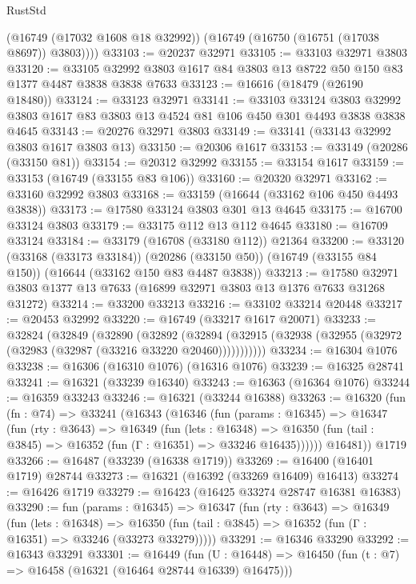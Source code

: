 \begin{lexlean}{RustStd}
\begin{coremodule}
        (@16749 (@17032 @1608 @18 @32992))
        (@16749 (@16750 (@16751 (@17038 @8697)) @3803))))
@33103 := @20237 @32971
@33105 := @33103 @32971 @3803
@33120 := @33105 @32992 @3803 @1617 @84 @3803 @13 @8722 @50 @150 @83 @1377 @4487 @3838 @3838 @7633
@33123 := @16616 (@18479 (@26190 @18480))
@33124 := @33123 @32971
@33141 := @33103
    @33124
    @3803
    @32992
    @3803
    @1617
    @83
    @3803
    @13
    @4524
    @81
    @106
    @450
    @301
    @4493
    @3838
    @3838
    @4645
@33143 := @20276 @32971 @3803
@33149 := @33141 (@33143 @32992 @3803 @1617 @3803 @13)
@33150 := @20306 @1617
@33153 := @33149 (@20286 (@33150 @81))
@33154 := @20312 @32992
@33155 := @33154 @1617
@33159 := @33153 (@16749 (@33155 @83 @106))
@33160 := @20320 @32971
@33162 := @33160 @32992 @3803
@33168 := @33159 (@16644 (@33162 @106 @450 @4493 @3838))
@33173 := @17580 @33124 @3803 @301 @13 @4645
@33175 := @16700 @33124 @3803
@33179 := @33175 @112 @13 @112 @4645
@33180 := @16709 @33124
@33184 := @33179 (@16708 (@33180 @112)) @21364
@33200 := @33120
    (@33168 (@33173 @33184))
    (@20286 (@33150 @50))
    (@16749 (@33155 @84 @150))
    (@16644 (@33162 @150 @83 @4487 @3838))
@33213 := @17580 @32971 @3803 @1377 @13 @7633 (@16899 @32971 @3803 @13 @1376 @7633 @31268 @31272)
@33214 := @33200 @33213
@33216 := @33102 @33214 @20448
@33217 := @20453 @32992
@33220 := @16749 (@33217 @1617 @20071)
@33233 := @32824
    (@32849
      (@32890
        (@32892
          (@32894 (@32915 (@32938 (@32955 (@32972 (@32983 (@32987 (@33216 @33220 @20460)))))))))))
@33234 := @16304 @1076
@33238 := @16306 (@16310 @1076) (@16316 @1076)
@33239 := @16325 @28741
@33241 := @16321 (@33239 @16340)
@33243 := @16363 (@16364 @1076)
@33244 := @16359 @33243
@33246 := @16321 (@33244 @16388)
@33263 := @16320
    (fun (fn : @74) =>
    @33241
      (@16343
        (@16346
          (fun (params : @16345) =>
          @16347
            (fun (rty : @3643) =>
            @16349
              (fun (lets : @16348) =>
              @16350 (fun (tail : @3845) => @16352 (fun (Γ : @16351) => @33246 @16435))))))
        @16481))
    @1719
@33266 := @16487 (@33239 (@16338 @1719))
@33269 := @16400 (@16401 @1719) @28744
@33273 := @16321 (@16392 (@33269 @16409) @16413)
@33274 := @16426 @1719
@33279 := @16423 (@16425 @33274 @28747 @16381 @16383)
@33290 := fun (params : @16345) =>
  @16347
    (fun (rty : @3643) =>
    @16349
      (fun (lets : @16348) =>
      @16350 (fun (tail : @3845) => @16352 (fun (Γ : @16351) => @33246 (@33273 @33279)))))
@33291 := @16346 @33290
@33292 := @16343 @33291
@33301 := @16449
    (fun (U : @16448) => @16450 (fun (t : @7) => @16458 (@16321 (@16464 @28744 @16339) @16475)))

\end{coremodule}
\end{lexlean}
